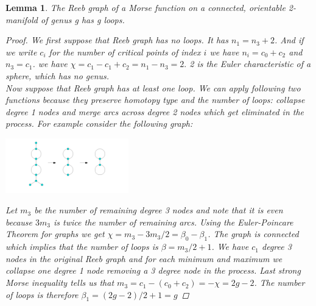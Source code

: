 \documentclass[]{article}
\newtheorem{lemma}{Lemma}
\begin{document}
\begin{lemma}
    The Reeb graph of a Morse function on a connected, orientable 2-manifold of genus g has g loops.
    \begin{proof}
        We first suppose that Reeb graph has no loops. It has $n_1 = n_3+2$. And if we write $c_i$ for the number of critical points of index $i$ we have $n_i = c_0+c_2$ and $n_3 = c_1$. we have $\chi = c_1 - c_1 +c_2 = n_1 - n_3 = 2.$  2 is the Euler characteristic of a sphere, which has no genus. \\ 
        Now suppose that Reeb graph has at least one loop. We can apply following two functions because they preserve homotopy type and the number of loops: collapse degree 1 nodes and merge arcs across degree 2 nodes which get eliminated in the process. For example consider the following graph:
    \begin{center}
    \includegraphics[width=0.4\textwidth]{homotopic_transformation.png}
    \end{center}
    Let $m_3$ be the number of remaining degree 3 nodes and note that it is even because $3m_3$ is twice the number of remaining arcs. Using the Euler-Poincare Theorem for graphs we get $\chi = m_3 - 3m_3/2 = \beta_0 - \beta_1$. The graph is connected which implies that the number of loops is $\beta = m_3/2+1$. We have $c_1$ degree 3 nodes in the original Reeb graph and for each minimum and maximum we collapse one degree 1 node removing a 3 degree node in the process. Last strong Morse inequality tells us that $m_3 = c_1 - (c_0 + c_2) = -\chi = 2g - 2$. The number of loops is therefore $ \beta_1 = (2g-2)/2+1=g$
    \end{proof}
\end{lemma}
\end{document}
